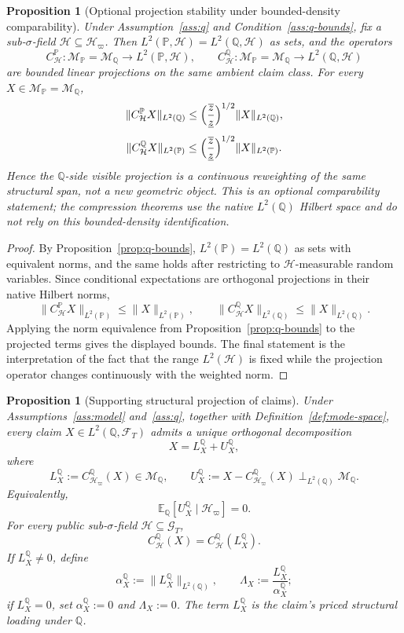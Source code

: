 \documentclass[11pt,a4paper]{amsart}
\theoremstyle{plain}
\newtheorem{proposition}[theorem]{Proposition}
\theoremstyle{definition}
\theoremstyle{remark}
\newcommand{\PP}{\mathbb{P}}
\newcommand{\QQ}{\mathbb{Q}}
\newcommand{\EE}{\mathbb{E}}
\newcommand{\cF}{\mathcal{F}}
\newcommand{\cG}{\mathcal{G}}
\newcommand{\cH}{\mathcal{H}}
\newcommand{\cM}{\mathcal{M}}
\begin{document}
\begin{proposition}[Optional projection stability under bounded-density comparability]\label{prop:proj-stability}
Under Assumption~\ref{ass:q} and Condition~\ref{ass:q-bounds}, fix a sub-\(\sigma\)-field
\(\cH\subseteq \cH_\varpi\).  Then \(L^2(\PP,\cH)=L^2(\QQ,\cH)\) as sets, and the operators
\[
        C_{\cH}^{\PP}\colon \cM_\PP=\cM_\QQ\to L^2(\PP,\cH),
        \qquad
        C_{\cH}^{\QQ}\colon \cM_\PP=\cM_\QQ\to L^2(\QQ,\cH)
\]
are bounded linear projections on the same ambient claim class.  For every
\(X\in \cM_\PP=\cM_\QQ\),
\[
        \|C_{\cH}^{\PP}X\|_{L^2(\QQ)}
        \le
        \Bigl(\frac{\overline z}{\underline z}\Bigr)^{1/2}
        \|X\|_{L^2(\QQ)},
\]
\[
        \|C_{\cH}^{\QQ}X\|_{L^2(\PP)}
        \le
        \Bigl(\frac{\overline z}{\underline z}\Bigr)^{1/2}
        \|X\|_{L^2(\PP)}.
\]
Hence the \(\QQ\)-side visible projection is a continuous reweighting of the same structural span,
not a new geometric object.  This is an optional comparability statement; the compression
theorems use the native \(L^2(\QQ)\) Hilbert space and do not rely on this bounded-density
identification.
\end{proposition}

\begin{proof}
By Proposition~\ref{prop:q-bounds}, \(L^2(\PP)=L^2(\QQ)\) as sets with equivalent norms, and the
same holds after restricting to \(\cH\)-measurable random variables.  Since conditional
expectations are orthogonal projections in their native Hilbert norms,
\[
        \|C_{\cH}^{\PP}X\|_{L^2(\PP)}\le \|X\|_{L^2(\PP)},
        \qquad
        \|C_{\cH}^{\QQ}X\|_{L^2(\QQ)}\le \|X\|_{L^2(\QQ)}.
\]
Applying the norm equivalence from Proposition~\ref{prop:q-bounds} to the projected terms gives the
displayed bounds.  The final statement is the interpretation of the fact that the range
\(L^2(\cH)\) is fixed while the projection operator changes continuously with the weighted norm.
\end{proof}

\begin{proposition}[Supporting structural projection of claims]\label{thm:claim-decomp}
Under Assumptions~\ref{ass:model} and~\ref{ass:q}, together with
Definition~\ref{def:mode-space}, every claim \(X\in L^2(\QQ,\cF_T)\) admits a
unique orthogonal decomposition
\[
        X=L_X^\QQ+U_X^\QQ,
\]
where
\[
        L_X^\QQ:=C_{\cH_\varpi}^\QQ(X)\in \cM_\QQ,
        \qquad
        U_X^\QQ:=X-C_{\cH_\varpi}^\QQ(X)\perp_{L^2(\QQ)} \cM_\QQ.
\]
Equivalently,
\[
        \EE_\QQ[U_X^\QQ\mid \cH_\varpi]=0.
\]
For every public sub-\(\sigma\)-field \(\cH\subseteq \cG_T\),
\[
        C_{\cH}^\QQ(X)=C_{\cH}^\QQ(L_X^\QQ).
\]
If \(L_X^\QQ\neq0\), define
\[
        \alpha_X^\QQ:=\|L_X^\QQ\|_{L^2(\QQ)},
        \qquad
        \Lambda_X:=\frac{L_X^\QQ}{\alpha_X^\QQ};
\]
if \(L_X^\QQ=0\), set \(\alpha_X^\QQ:=0\) and \(\Lambda_X:=0\).  The term \(L_X^\QQ\) is the
claim's \emph{priced structural loading under \(\QQ\)}.
\end{proposition}
\end{document}
